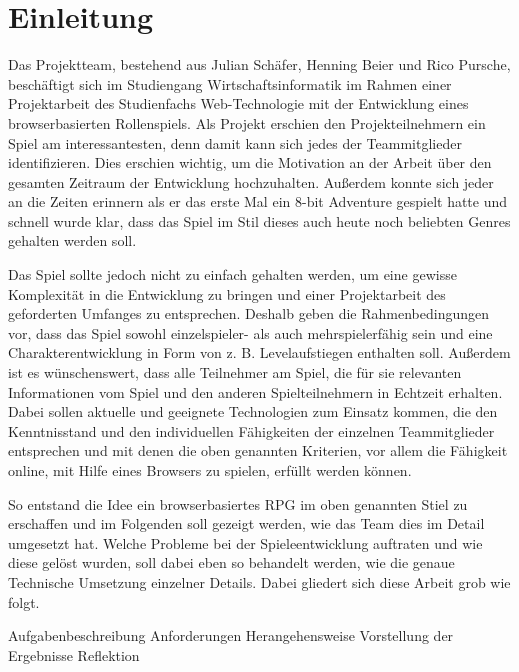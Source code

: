 

\section{Einleitung}

Das Projektteam, bestehend aus Julian Schäfer, Henning Beier und Rico Pursche, beschäftigt sich im Studiengang Wirtschaftsinformatik im Rahmen einer Projektarbeit des Studienfachs Web-Technologie mit der Entwicklung eines browserbasierten Rollenspiels. 
Als Projekt erschien den Projekteilnehmern ein Spiel am interessantesten, denn damit kann sich jedes der Teammitglieder identifizieren. Dies erschien wichtig, um die Motivation an der Arbeit über den gesamten Zeitraum der Entwicklung hochzuhalten. Außerdem konnte sich jeder an die Zeiten erinnern als er das erste Mal ein 8-bit Adventure gespielt hatte und schnell wurde klar, dass das Spiel im Stil dieses auch heute noch beliebten Genres gehalten werden soll.

Das Spiel sollte jedoch nicht zu einfach gehalten werden, um eine gewisse Komplexität in die Entwicklung zu bringen und einer Projektarbeit des geforderten Umfanges zu entsprechen. Deshalb geben die Rahmenbedingungen vor, dass das Spiel sowohl einzelspieler- als auch mehrspielerfähig sein und eine Charakterentwicklung in Form von z. B. Levelaufstiegen enthalten soll. Außerdem ist es wünschenswert, dass alle Teilnehmer am Spiel, die für sie relevanten Informationen vom Spiel und den anderen Spielteilnehmern in Echtzeit erhalten. Dabei sollen aktuelle und geeignete Technologien zum Einsatz kommen, die den Kenntnisstand und den individuellen Fähigkeiten der einzelnen Teammitglieder entsprechen und mit denen die oben genannten Kriterien, vor allem die Fähigkeit online, mit Hilfe eines Browsers zu spielen, erfüllt werden können. 

So entstand die Idee ein browserbasiertes RPG im oben genannten Stiel zu erschaffen und im Folgenden soll gezeigt werden, wie das Team dies im Detail umgesetzt hat. Welche Probleme bei der Spieleentwicklung auftraten und wie diese gelöst wurden, soll dabei eben so behandelt werden, wie die genaue Technische Umsetzung einzelner Details. Dabei gliedert sich diese Arbeit grob wie folgt.

Aufgabenbeschreibung
Anforderungen
Herangehensweise
Vorstellung der Ergebnisse
Reflektion


